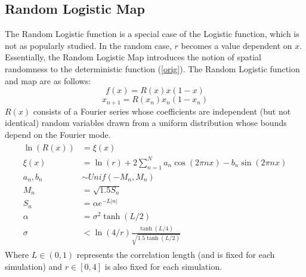 \documentclass[12pt]{article}
\begin{document}
\subsection{Random Logistic Map}
The Random Logistic function is a special case of the Logistic
function, which is not as popularly studied. In the random case, $r$ becomes a value dependent on $x$. Essentially, the Random Logistic
Map introduces the notion of spatial randomness to the deterministic
function (\ref{orig}). The Random Logistic function and map are as follows:
\begin{equation*}
f(x) = R(x)x(1-x)
\end{equation*}
\begin{equation}\label{randmap}
x_{n+1} = R(x_n)x_n(1-x_n)
\end{equation}
$R(x)$ consists of a Fourier series whose coefficients are independent
(but not identical) random variables drawn from a uniform
distribution whose bounds depend on the Fourier mode. 
\begin{align*}
\begin{split}
\ln(R(x)) &= \xi(x)\\
\xi(x) &= \ln(r) + 2\sum^N_{n=1}a_n\cos(2\pi nx)-b_n\sin(2\pi nx)\\
a_n,b_n &\sim Unif(-M_n,M_n)\\
M_n &= \sqrt{1.5S_n}\\
S_n &= \alpha e^{-L|n|}\\
\alpha &= \sigma^2 \tanh(L/2)\\
\sigma &< \ln(4/r)\frac{\tanh(L/4)}{\sqrt{1.5\tanh(L/2)}}
\end{split}
\end{align*}
Where $L \in (0,1)$ represents the correlation length (and is fixed
for each simulation) and $r \in [0,4]$ is also fixed for each simulation.
\end{document}
